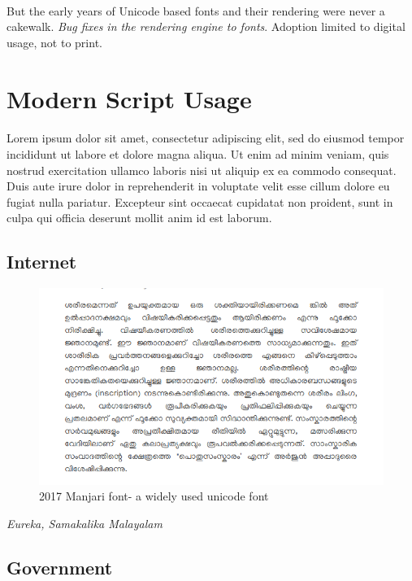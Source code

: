 \documentclass[10pt]{article}
\begin{document}
\paragraph{}
But the early years of Unicode based fonts and their rendering were never a cakewalk. \textit{Bug fixes in the rendering engine to fonts}. Adoption limited to digital usage, not to print.

\section{Modern Script Usage}
\paragraph{}

Lorem ipsum dolor sit amet, consectetur adipiscing elit, sed do eiusmod tempor incididunt ut labore et dolore magna aliqua. Ut enim ad minim veniam, quis nostrud exercitation ullamco laboris nisi ut aliquip ex ea commodo consequat. Duis aute irure dolor in reprehenderit in voluptate velit esse cillum dolore eu fugiat nulla pariatur. Excepteur sint occaecat cupidatat non proident, sunt in culpa qui officia deserunt mollit anim id est laborum.

\subsection{Internet}
\begin{figure}
 \centering
  \includegraphics[width=1.0\textwidth]{images/Manjari-Body-Text.png}
   \caption{2017 Manjari font- a widely used unicode font}
\end{figure}


\textit{Eureka, Samakalika Malayalam}

\subsection{Government}
\end{document}
